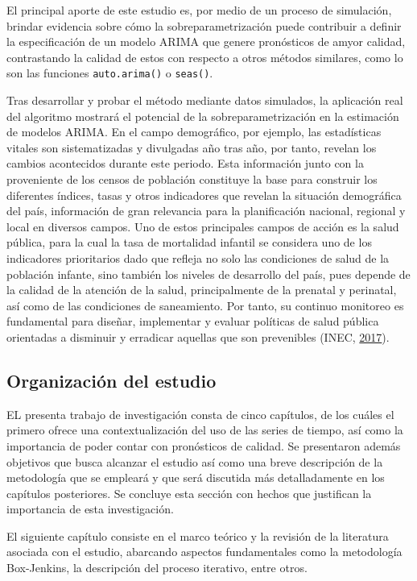 \documentclass[
]{article}
\begin{document}
El principal aporte de este estudio es, por medio de un proceso de
simulación, brindar evidencia sobre cómo la sobreparametrización puede
contribuir a definir la especificación de un modelo ARIMA que genere
pronósticos de amyor calidad, contrastando la calidad de estos con
respecto a otros métodos similares, como lo son las funciones
\texttt{auto.arima()} o \texttt{seas()}.

Tras desarrollar y probar el método mediante datos simulados, la
aplicación real del algoritmo mostrará el potencial de la
sobreparametrización en la estimación de modelos ARIMA. En el campo
demográfico, por ejemplo, las estadísticas vitales son sistematizadas y
divulgadas año tras año, por tanto, revelan los cambios acontecidos
durante este periodo. Esta información junto con la proveniente de los
censos de población constituye la base para construir los diferentes
índices, tasas y otros indicadores que revelan la situación demográfica
del país, información de gran relevancia para la planificación nacional,
regional y local en diversos campos. Uno de estos principales campos de
acción es la salud pública, para la cual la tasa de mortalidad infantil
se considera uno de los indicadores prioritarios dado que refleja no
solo las condiciones de salud de la población infante, sino también los
niveles de desarrollo del país, pues depende de la calidad de la
atención de la salud, principalmente de la prenatal y perinatal, así
como de las condiciones de saneamiento. Por tanto, su continuo monitoreo
es fundamental para diseñar, implementar y evaluar políticas de salud
pública orientadas a disminuir y erradicar aquellas que son prevenibles
(INEC, \protect\hyperlink{ref-calidad_vitales}{2017}).

\subsection{Organización del estudio}

EL presenta trabajo de investigación consta de cinco capítulos, de los
cuáles el primero ofrece una contextualización del uso de las series de
tiempo, así como la importancia de poder contar con pronósticos de
calidad. Se presentaron además objetivos que busca alcanzar el estudio
así como una breve descripción de la metodología que se empleará y que
será discutida más detalladamente en los capítulos posteriores. Se
concluye esta sección con hechos que justifican la importancia de esta
investigación.

El siguiente capítulo consiste en el marco teórico y la revisión de la
literatura asociada con el estudio, abarcando aspectos fundamentales
como la metodología Box-Jenkins, la descripción del proceso iterativo,
entre otros.
\end{document}
